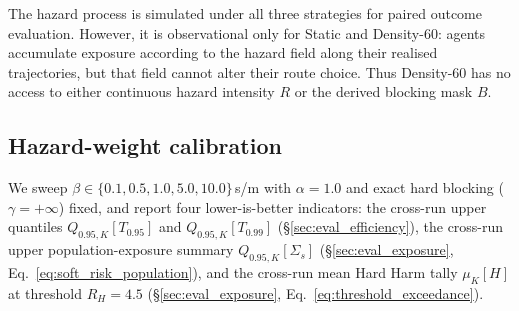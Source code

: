 \documentclass[preprint,12pt]{elsarticle}
\providecommand{\FloatBarrier}{}
\let\origsubsection\subsection
\renewcommand{\subsection}{\FloatBarrier\origsubsection}
\begin{document}
The hazard process is simulated under all three strategies for paired
outcome evaluation. However, it is observational only for Static and
Density-60: agents accumulate exposure according to the hazard field
along their realised trajectories, but that field cannot alter their
route choice. Thus Density-60 has no access to either continuous hazard
intensity $R$ or the derived blocking mask $B$.


\subsection{Hazard-weight calibration}
\label{sec:beta_calibration}

We sweep $\beta \in \{0.1, 0.5, 1.0, 5.0, 10.0\}$\,s/m with
$\alpha = 1.0$ and exact hard blocking ($\gamma=+\infty$) fixed, and
report four
lower-is-better indicators:
the cross-run upper quantiles $Q_{0.95,K}[T_{0.95}]$ and
$Q_{0.95,K}[T_{0.99}]$
(\S\ref{sec:eval_efficiency}), the cross-run upper population-exposure summary
$Q_{0.95,K}[\Sigma_s]$
(\S\ref{sec:eval_exposure}, Eq.~\ref{eq:soft_risk_population}), and the cross-run
mean Hard Harm tally $\mu_K[H]$ at threshold $R_H=4.5$
(\S\ref{sec:eval_exposure}, Eq.~\ref{eq:threshold_exceedance}).
\end{document}
